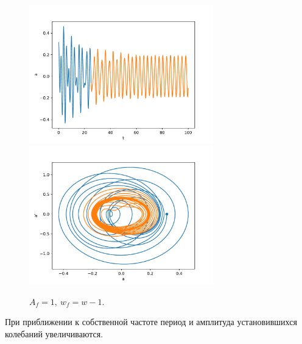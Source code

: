             \begin{figure}[H]
                \centering
                \includegraphics[width=8cm]{pictures/5resonance2.pdf}
                \includegraphics[width=8cm]{pictures/5resonance2p.pdf}
                \caption{$A_f = 1, ~ w_f = w-1$.}
            \end{figure}
            При приближении к собственной частоте период и амплитуда установившихся колебаний увеличиваются.

